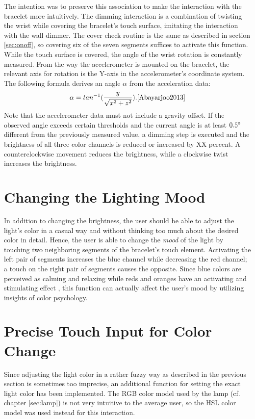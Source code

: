 The intention was to preserve this association to make the interaction with the bracelet more intuitively. The dimming interaction is a combination of twisting the wrist while covering the bracelet's touch surface, imitating the interaction with the wall dimmer. The cover check routine is the same as described in section \ref{sec:onoff}, so covering six of the seven segments suffices to activate this function. While the touch surface is covered, the angle of the wrist rotation is constantly measured. From the way the accelerometer is mounted on the bracelet, the relevant axis for rotation is the Y-axis in the accelerometer's coordinate system. The following formula derives an angle $\alpha$ from the acceleration data:
\[ %
\alpha = tan^{-1}(\frac{y}{\sqrt{x^2 + z^2}}). \cite{Abayarjoo2013}
\]
Note that the accelerometer data must not include a gravity offset. If the observed angle exceeds certain thresholds and the current angle is at least $0.5\degree$ different from the previously measured value, a dimming step is executed and the brightness of all three color channels is reduced or increased by XX percent. A counterclockwise movement reduces the brightness, while a clockwise twist increases the brightness.

\section{Changing the Lighting Mood}
In addition to changing the brightness, the user should be able to adjust the light's color in a casual way and without thinking too much about the desired color in detail. Hence, the user is able to change the \textit{mood} of the light by touching two neighboring segments of the bracelet's touch element. Activating the left pair of segments increases the blue channel while decreasing the red channel; a touch on the right pair of segments causes the opposite. Since blue colors are perceived as calming and relaxing while reds and oranges have an activating and stimulating effect \cite{Rosenstein1985}, this function can actually affect the user's mood by utilizing insights of color psychology.

\section{Precise Touch Input for Color Change}
Since adjusting the light color in a rather fuzzy way as described in the previous section is sometimes too imprecise, an additional function for setting the exact light color has been implemented. The RGB color model used by the lamp (cf. chapter \ref{sec:lamp}) is not very intuitive to the average user, so the \ac{HSL} color model was used instead for this interaction.

